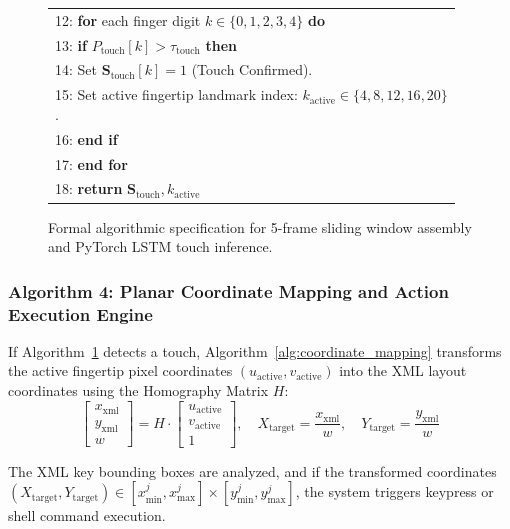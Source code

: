 \begin{figure}[htbp]
\begin{minipage}{0.92\textwidth}
\begin{tabular}{|p{0.96\linewidth}|}
{\small 12: \textbf{for} each finger digit $k \in \{0, 1, 2, 3, 4\}$ \textbf{do}} \\
{\small 13: \hspace{1em} \textbf{if} $P_{\text{touch}}[k] > \tau_{\text{touch}}$ \textbf{then}} \\
{\small 14: \hspace{2em} Set $\mathbf{S}_{\text{touch}}[k] = 1$ (Touch Confirmed).} \\
{\small 15: \hspace{2em} Set active fingertip landmark index: $k_{\text{active}} \in \{4, 8, 12, 16, 20\}$.} \\
{\small 16: \hspace{1em} \textbf{end if}} \\
{\small 17: \textbf{end for}} \\
{\small 18: \textbf{return} $\mathbf{S}_{\text{touch}}, k_{\text{active}}$} \\
\hline
\end{tabular}
\end{minipage}
\caption{Formal algorithmic specification for 5-frame sliding window assembly and PyTorch LSTM touch inference.}
\label{alg:lstm_touch_inference}
\end{figure}

\subsubsection{Algorithm 4: Planar Coordinate Mapping and Action Execution Engine}
If Algorithm~\ref{alg:lstm_touch_inference} detects a touch, Algorithm~\ref{alg:coordinate_mapping} transforms the active fingertip pixel coordinates $(u_{\text{active}}, v_{\text{active}})$ into the XML layout coordinates using the Homography Matrix $H$:
\begin{equation}
\begin{bmatrix} x_{\text{xml}} \\ y_{\text{xml}} \\ w \end{bmatrix} = H \cdot \begin{bmatrix} u_{\text{active}} \\ v_{\text{active}} \\ 1 \end{bmatrix}, \quad
X_{\text{target}} = \frac{x_{\text{xml}}}{w}, \quad Y_{\text{target}} = \frac{y_{\text{xml}}}{w}
\label{eq:homog_mapping_app}
\end{equation}

The XML key bounding boxes are analyzed, and if the transformed coordinates $(X_{\text{target}}, Y_{\text{target}}) \in [x_{\min}^j, x_{\max}^j] \times [y_{\min}^j, y_{\max}^j]$, the system triggers keypress or shell command execution.

